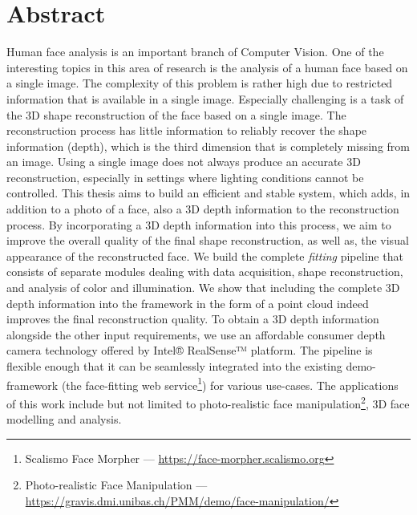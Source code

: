 \chapter{Abstract}

Human face analysis is an important branch of Computer Vision. One of the interesting topics in this area of research is the analysis of a human face based on a single image. The complexity of this problem is rather high due to restricted information that is available in a single image.  Especially challenging is a task of the 3D shape reconstruction of the face based on a single image. The reconstruction process has little information to reliably recover the shape information (depth), which is the third dimension that is completely missing from an image. Using a single image does not always produce an accurate 3D reconstruction, especially in settings where lighting conditions cannot be controlled. This thesis aims to build an efficient and stable system, which adds, in addition to a photo of a face, also a 3D depth information to the reconstruction process. By incorporating a 3D depth information into this process, we aim to improve the overall quality of the final shape reconstruction, as well as, the visual appearance of the reconstructed face. We build the complete \textit{fitting} pipeline that consists of separate modules dealing with data acquisition, shape reconstruction, and analysis of color and illumination. We show that including the complete 3D depth information into the framework in the form of a point cloud indeed improves the final reconstruction quality. To obtain a 3D depth information alongside the other input requirements, we use an affordable consumer depth camera technology offered by Intel® RealSense™ platform. The pipeline is flexible enough that it can be seamlessly integrated into the existing demo-framework (the face-fitting web service\footnote{Scalismo Face Morpher — \url{https://face-morpher.scalismo.org}}) for various use-cases. The applications of this work include but not limited to photo-realistic face manipulation\footnote{Photo-realistic Face Manipulation — \url{https://gravis.dmi.unibas.ch/PMM/demo/face-manipulation/}}, 3D face modelling and analysis. 